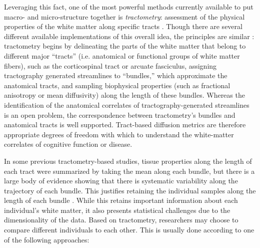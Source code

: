 Leveraging this fact, one of the most powerful methods currently
available to put macro- and micro-structure together is
\emph{tractometry}: assessment of the physical properties of the white
matter along specific tracts \cite{Bells2011-cf}. Though there are
several different available implementations of this overall idea,
the principles are similar \cite{yeatman2012tract, Yendiki2011-ay,
Wassermann2016-iv, ODonnell2009-uu}: tractometry begins by delineating
the parts of the white matter that belong to different major ``tracts''
(i.e. anatomical or functional groups of white matter fibers),
such as the corticospinal tract or arcuate fasciculus, assigning
tractography generated streamlines to ``bundles,'' which approximate
the anatomical tracts, and sampling biophysical properties (such
as fractional anisotropy or mean diffusivity) along the length
of these bundles. Whereas the identification of the anatomical
correlates of tractography-generated streamlines is an open problem,
the correspondence between tractometry's bundles and anatomical tracts
is well supported. Tract-based diffusion metrics are therefore
appropriate degrees of freedom with which to understand the
white-matter correlates of cognitive function or disease.

In some previous tractometry-based studies, tissue properties along
the length of each tract were summarized by taking the mean along
each bundle, but there is a large body of evidence showing that there
is systematic variability along the trajectory of each bundle. This
justifies retaining the individual samples along the length of each
bundle \cite{yeatman2012tract, colby2012, ODonnell2009-uu}. While this
retains important information about each individual's white matter, it
also presents statistical challenges due to the dimensionality of the
data. Based on tractometry, researchers may choose to compare different
individuals to each other. This is usually done according to one of the
following approaches:

